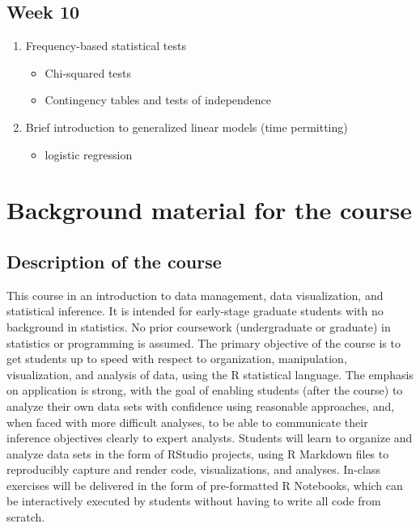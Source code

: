 \documentclass[]{book}
\providecommand{\tightlist}{%
  \setlength{\itemsep}{0pt}\setlength{\parskip}{0pt}}
\begin{document}
\hypertarget{week-10}{%
\section{Week 10}\label{week-10}}

\begin{enumerate}
\def\labelenumi{\arabic{enumi}.}
\tightlist
\item
  Frequency-based statistical tests

  \begin{itemize}
  \tightlist
  \item
    Chi-squared tests
  \item
    Contingency tables and tests of independence
  \end{itemize}
\item
  Brief introduction to generalized linear models (time permitting)

  \begin{itemize}
  \tightlist
  \item
    logistic regression
  \end{itemize}
\end{enumerate}

\hypertarget{background-material-for-the-course}{%
\chapter{Background material for the course}\label{background-material-for-the-course}}

\hypertarget{description-of-the-course}{%
\section{Description of the course}\label{description-of-the-course}}

This course in an introduction to data management, data visualization, and statistical
inference. It is intended for early-stage graduate students with no background in
statistics. No prior coursework (undergraduate or graduate) in statistics or
programming is assumed. The primary objective of the course is to get students up to
speed with respect to organization, manipulation, visualization, and analysis of data,
using the R statistical language. The emphasis on application is strong, with the goal
of enabling students (after the course) to analyze their own data sets with confidence
using reasonable approaches, and, when faced with more difficult analyses,
to be able to communicate their inference objectives clearly to expert analysts.
Students will learn to organize and analyze data sets in the form of RStudio projects,
using R Markdown files to reproducibly capture and render code, visualizations, and
analyses. In-class exercises will be delivered in the form of pre-formatted R
Notebooks, which can be interactively executed by students without having to write
all code from scratch.
\end{document}
